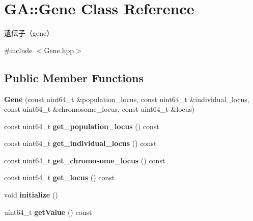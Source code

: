 \hypertarget{class_g_a_1_1_gene}{}\section{GA\+::Gene Class Reference}
\label{class_g_a_1_1_gene}


遺伝子（gene）  




{\ttfamily \#include $<$Gene.\+hpp$>$}

\subsection*{Public Member Functions}
\begin{DoxyCompactItemize}
\item 
\mbox{\label{class_g_a_1_1_gene_ad8c6c947bed85da87ba7af7fd38026cb}} 
{\bfseries Gene} (const uint64\+\_\+t \&population\+\_\+locus, const uint64\+\_\+t \&individual\+\_\+locus, const uint64\+\_\+t \&chromosome\+\_\+locus, const uint64\+\_\+t \&locus)
\item 
\mbox{\label{class_g_a_1_1_gene_a9c45d17991551b3f78416957e3ea3384}} 
const uint64\+\_\+t {\bfseries get\+\_\+population\+\_\+locus} () const
\item 
\mbox{\label{class_g_a_1_1_gene_a138bcde865793d349d1036fcfce96f01}} 
const uint64\+\_\+t {\bfseries get\+\_\+individual\+\_\+locus} () const
\item 
\mbox{\label{class_g_a_1_1_gene_a069f8b9d37c18bf5a3c446eecf535ec1}} 
const uint64\+\_\+t {\bfseries get\+\_\+chromosome\+\_\+locus} () const
\item 
\mbox{\label{class_g_a_1_1_gene_a0b58ea2909624a7a5544cce204aef54a}} 
const uint64\+\_\+t {\bfseries get\+\_\+locus} () const
\item 
\mbox{\label{class_g_a_1_1_gene_a0c7cfdbc1581c8132c43feeb175b4c83}} 
void {\bfseries initialize} ()
\item 
\mbox{\label{class_g_a_1_1_gene_aa4b655e48f5a846b96ffe27d6e6b3f96}} 
uint64\+\_\+t {\bfseries get\+Value} () const
\end{DoxyCompactItemize}

